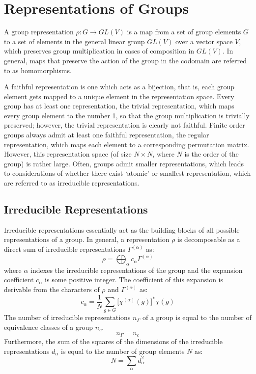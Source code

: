 \documentclass[]{report}
\begin{document}
\section{Representations of Groups}
A group representation $\rho:G\rightarrow GL(V)$ is a map from a set of group elements $G$ to a set of elements in the general linear group $GL(V)$ over a vector space $V$, which preserves group multiplication in cases of composition in $GL(V)$. In general, maps that preserve the action of the group in the codomain are referred to as homomorphisms.

A faithful representation is one which acts as a bijection, that is, each group element gets mapped to a unique element in the representation space. Every group has at least one representation, the trivial representation, which maps every group element to the number 1, so that the group multiplication is trivially preserved; however, the trivial representation is clearly not faithful. Finite order groups always admit at least one faithful representation, the regular representation, which maps each element to a corresponding permutation matrix. However, this representation space (of size $N\times N$, where $N$ is the order of the group) is rather large. Often, groups admit smaller representations, which leads to considerations of whether there exist `atomic' or smallest representation, which are referred to as irreducible representations.


\subsection{Irreducible Representations}
Irreducible representations essentially act as the building blocks of all possible representations of a group. In general, a representation $\rho$ is decomposable as a direct sum of irreducible representations $\Gamma^{(\alpha)}$ as:
\begin{equation}
\rho = \bigoplus_{\alpha}c_{\alpha}\Gamma^{(\alpha)}
\end{equation}
where $\alpha$ indexes the irreducible representations of the group and the expansion coefficient $c_{\alpha}$ is some positive integer. The coefficient of this expansion is derivable from the characters of $\rho$ and $\Gamma^{(\alpha)}$ as:
\begin{equation}
c_{\alpha}=\frac{1}{N}\sum_{g\in G}\big[\chi^{(\alpha)}(g)\big]^*\chi(g)
\end{equation}
The number of irreducible representations $n_{\Gamma}$ of a group is equal to the number of equivalence classes of a group $n_c$.
\begin{equation}
n_{\Gamma}=n_c
\end{equation}
Furthermore, the sum of the squares of the dimensions of the irreducible representations $d_{\alpha}$ is equal to the number of group elements $N$ as:
\begin{equation}
	N = \sum_{\alpha}d_{\alpha}^2
\end{equation}
\end{document}
